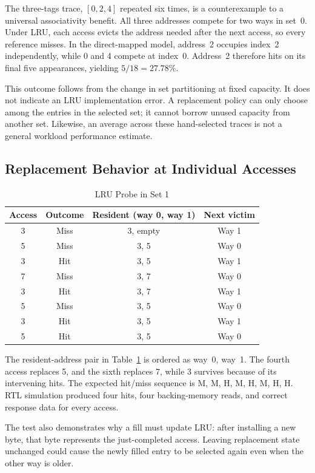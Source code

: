\documentclass[conference]{IEEEtran}
\begin{document}
The three-tags trace, $[0,2,4]$ repeated six times, is a counterexample
to a universal associativity benefit. All three addresses compete for
two ways in set~0. Under LRU, each access evicts the address needed
after the next access, so every reference misses. In the direct-mapped
model, address~2 occupies index~2 independently, while 0 and 4 compete
at index~0. Address~2 therefore hits on its final five appearances,
yielding $5/18 = 27.78\%$.

This outcome follows from the change in set partitioning at fixed
capacity. It does not indicate an LRU implementation error. A
replacement policy can only choose among the entries in the selected
set; it cannot borrow unused capacity from another set. Likewise, an
average across these hand-selected traces is not a general workload
performance estimate.

\subsection{Replacement Behavior at Individual Accesses}

\begin{table}[!t]
\caption{LRU Probe in Set 1}
\label{tab:lruprobe}
\centering
\begin{tabular}{cccc}
\toprule
Access & Outcome & Resident (way 0, way 1) & Next victim \\
\midrule
3 & Miss & 3, empty & Way 1 \\
5 & Miss & 3, 5 & Way 0 \\
3 & Hit  & 3, 5 & Way 1 \\
7 & Miss & 3, 7 & Way 0 \\
3 & Hit  & 3, 7 & Way 1 \\
5 & Miss & 3, 5 & Way 0 \\
3 & Hit  & 3, 5 & Way 1 \\
5 & Hit  & 3, 5 & Way 0 \\
\bottomrule
\end{tabular}
\end{table}

The resident-address pair in Table~\ref{tab:lruprobe} is ordered as
way~0, way~1. The fourth access replaces 5, and the sixth replaces 7,
while 3 survives because of its intervening hits. The expected hit/miss
sequence is M, M, H, M, H, M, H, H. RTL simulation produced four hits,
four backing-memory reads, and correct response data for every access.

The test also demonstrates why a fill must update LRU: after installing
a new byte, that byte represents the just-completed access. Leaving
replacement state unchanged could cause the newly filled entry to be
selected again even when the other way is older.
\end{document}
